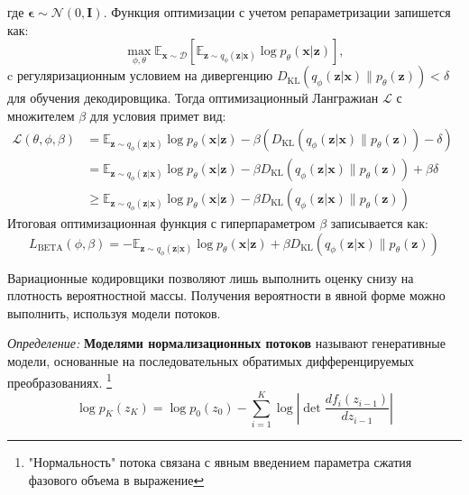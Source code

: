 где $\boldsymbol{\epsilon} \sim \mathcal{N}(0, \boldsymbol{I})$. Функция оптимизации с учетом репараметризации запишется как:
\begin{equation}
    \max_{\phi, \theta} \mathbb{E}_{\mathbf{x}\sim\mathcal{D}}[\mathbb{E}_{\mathbf{z} \sim q_\phi(\mathbf{z}\vert\mathbf{x})} \log p_\theta(\mathbf{x}\vert\mathbf{z})],
\end{equation}
c регуляризационным условием на дивергенцию $D_\text{KL}(q_\phi(\mathbf{z}\vert\mathbf{x})\|p_\theta(\mathbf{z})) < \delta$ для обучения декодировщика. 
Тогда оптимизационный Лангражиан $\mathcal{L}$ с множителем $\beta$ для условия примет вид:
\begin{equation}
    \begin{aligned}
        \mathcal{L}(\theta, \phi, \beta) &= \mathbb{E}_{\mathbf{z} \sim q_\phi(\mathbf{z}\vert\mathbf{x})} \log p_\theta(\mathbf{x}\vert\mathbf{z}) - \beta(D_\text{KL}(q_\phi(\mathbf{z}\vert\mathbf{x})\|p_\theta(\mathbf{z})) - \delta) & \\
        & = \mathbb{E}_{\mathbf{z} \sim q_\phi(\mathbf{z}\vert\mathbf{x})} \log p_\theta(\mathbf{x}\vert\mathbf{z}) - \beta D_\text{KL}(q_\phi(\mathbf{z}\vert\mathbf{x})\|p_\theta(\mathbf{z})) + \beta \delta & \\
        & \geq \mathbb{E}_{\mathbf{z} \sim q_\phi(\mathbf{z}\vert\mathbf{x})} \log p_\theta(\mathbf{x}\vert\mathbf{z}) - \beta D_\text{KL}(q_\phi(\mathbf{z}\vert\mathbf{x})\|p_\theta(\mathbf{z}))
    \end{aligned}
\end{equation}
Итоговая оптимизационная функция с гиперпараметром $\beta$ записывается как:
$$
L_\text{BETA}(\phi, \beta) = - \mathbb{E}_{\mathbf{z} \sim q_\phi(\mathbf{z}\vert\mathbf{x})} \log p_\theta(\mathbf{x}\vert\mathbf{z}) + \beta D_\text{KL}(q_\phi(\mathbf{z}\vert\mathbf{x})\|p_\theta(\mathbf{z}))
$$

Вариационные кодировщики позволяют лишь выполнить оценку снизу на плотность вероятностной массы. Получения вероятности в явной форме можно выполнить, используя модели потоков.

\textit{Определение:} \textbf{Моделями нормализационных потоков} называют генеративные модели, основанные на последовательных обратимых дифференцируемых преобразованиях. 
\footnote{"Нормальность" потока связана с явным введением параметра сжатия фазового объема в выражение}
\begin{equation}
    \log p_{K}(z_K) = \log p_0(z_0) - \sum_{i=1}^K \log \left|\det \frac{d f_i(z_{i-1})}{d z_{i-1}} \right| 
\end{equation}

